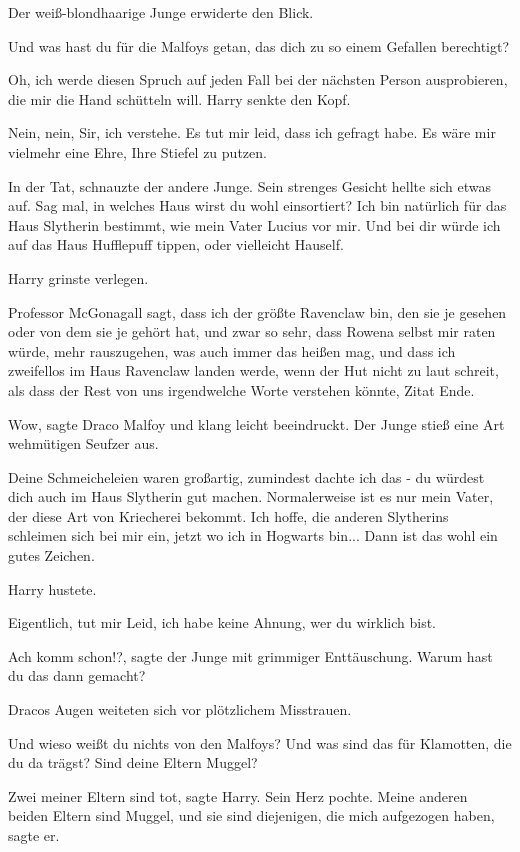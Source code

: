 Der weiß-blondhaarige Junge erwiderte den Blick.

\glqq{}Und was hast du für die Malfoys getan, das dich zu so einem Gefallen
berechtigt?\grqq{}

Oh, ich werde diesen Spruch auf jeden Fall bei der nächsten Person ausprobieren,
die mir die Hand schütteln will. Harry senkte den Kopf.

\glqq{}Nein, nein, Sir, ich verstehe. Es tut mir leid, dass ich gefragt habe. Es
wäre mir vielmehr eine Ehre, Ihre Stiefel zu putzen.\grqq{}

\glqq{}In der Tat\grqq{}, schnauzte der andere Junge. Sein strenges Gesicht
hellte sich etwas auf. \glqq{}Sag mal, in welches Haus wirst du wohl einsortiert?
Ich bin natürlich für das Haus Slytherin bestimmt, wie mein Vater Lucius vor
mir. Und bei dir würde ich auf das Haus Hufflepuff tippen, oder vielleicht
Hauself.

Harry grinste verlegen.

\glqq{}Professor McGonagall sagt, dass ich der größte Ravenclaw bin, den sie je
gesehen oder von dem sie je gehört hat, und zwar so sehr, dass Rowena selbst mir
raten würde, mehr rauszugehen, was auch immer das heißen mag, und dass ich
zweifellos im Haus Ravenclaw landen werde, wenn der Hut nicht zu laut schreit,
als dass der Rest von uns irgendwelche Worte verstehen könnte, Zitat
Ende.\grqq{}

\glqq{}Wow\grqq{}, sagte Draco Malfoy und klang leicht beeindruckt. Der Junge
stieß eine Art wehmütigen Seufzer aus.

\glqq{}Deine Schmeicheleien waren großartig, zumindest dachte ich das - du
würdest dich auch im Haus Slytherin gut machen. Normalerweise ist es nur mein
Vater, der diese Art von Kriecherei bekommt. Ich hoffe, die anderen Slytherins
schleimen sich bei mir ein, jetzt wo ich in Hogwarts bin... Dann ist das wohl
ein gutes Zeichen.\grqq{}

Harry hustete.

\glqq{}Eigentlich, tut mir Leid, ich habe keine Ahnung, wer du wirklich
bist.\grqq{}

\glqq{}Ach komm schon!?\grqq{}, sagte der Junge mit grimmiger Enttäuschung. \glqq
Warum hast du das dann gemacht?\grqq{}

Dracos Augen weiteten sich vor plötzlichem Misstrauen.

\glqq{}Und wieso weißt du nichts von den Malfoys? Und was sind das für Klamotten,
die du da trägst? Sind deine Eltern Muggel?\grqq{}

\glqq{}Zwei meiner Eltern sind tot\grqq{}, sagte Harry. Sein Herz pochte. \glqq
Meine anderen beiden Eltern sind Muggel, und sie sind diejenigen, die mich
aufgezogen haben\grqq{}, sagte er.

